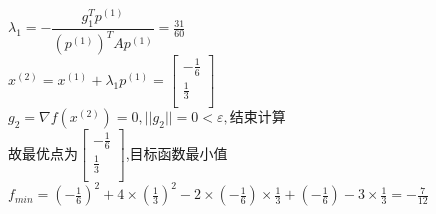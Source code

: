 \begin{solution}
    $\lambda_1=-\dfrac{g_1^Tp^{(1)}}{(p^{(1)})^TAp^{(1)}}=\frac{31}{60}$\\
    $x^{(2)}=x^{(1)}+\lambda_1p^{(1)}=\begin{bmatrix} -\frac{1}{6}\\\frac{1}{3}\\\end{bmatrix}$\\
    $g_2=\nabla f(x^{(2)})=0,||g_2||=0<\varepsilon,\text{结束计算}$\\
    故最优点为$\begin{bmatrix} -\frac{1}{6}\\\frac{1}{3}\\\end{bmatrix}$,目标函数最小值$f_{min}=(-\frac{1}{6})^2+4\times(\frac{1}{3})^2-2\times(-\frac{1}{6})\times\frac{1}{3}+(-\frac{1}{6})-3\times\frac{1}{3}=-\frac{7}{12}$
\end{solution}

